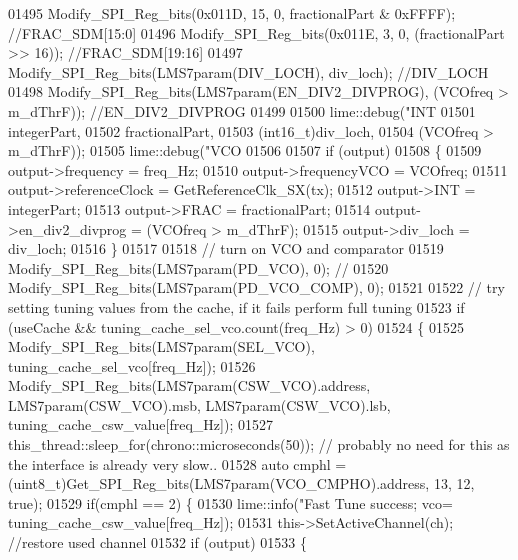 \begin{DoxyCode}
{{{{{{{{{{{{{{{{{{{{{{{{{{{{{{{{{{{{{{{{{{{01495     Modify_SPI_Reg_bits(0x011D, 15, 0, fractionalPart & 0xFFFF); \textcolor{comment}{//FRAC\_SDM[15:0]}
01496     Modify_SPI_Reg_bits(0x011E, 3, 0, (fractionalPart >> 16)); \textcolor{comment}{//FRAC\_SDM[19:16]}
01497     Modify_SPI_Reg_bits(LMS7param(DIV_LOCH), div\_loch); \textcolor{comment}{//DIV\_LOCH}
01498     Modify_SPI_Reg_bits(LMS7param(EN_DIV2_DIVPROG), (VCOfreq > m\_dThrF)); \textcolor{comment}{//EN\_DIV2\_DIVPROG}
01499 
01500     lime::debug(\textcolor{stringliteral}{"INT %
01501                 integerPart,
01502                 fractionalPart,
01503                 (int16\_t)div\_loch,
01504                 (VCOfreq > m\_dThrF));
01505     lime::debug(\textcolor{stringliteral}{"VCO %
01506 
01507     \textcolor{keywordflow}{if} (output)
01508     \{
01509         output->frequency = freq\_Hz;
01510         output->frequencyVCO = VCOfreq;
01511         output->referenceClock = GetReferenceClk_SX(tx);
01512         output->INT = integerPart;
01513         output->FRAC = fractionalPart;
01514         output->en_div2_divprog = (VCOfreq > m\_dThrF);
01515         output->div_loch = div\_loch;
01516     \}
01517 
01518     \textcolor{comment}{// turn on VCO and comparator}
01519     Modify_SPI_Reg_bits(LMS7param(PD_VCO), 0); \textcolor{comment}{//}
01520     Modify_SPI_Reg_bits(LMS7param(PD_VCO_COMP), 0);
01521 
01522     \textcolor{comment}{// try setting tuning values from the cache, if it fails perform full tuning}
01523     \textcolor{keywordflow}{if}  (useCache && tuning\_cache\_sel\_vco.count(freq\_Hz) > 0)
01524     \{
01525         Modify_SPI_Reg_bits(LMS7param(SEL_VCO), tuning\_cache\_sel\_vco[freq\_Hz]);
01526         Modify_SPI_Reg_bits(LMS7param(CSW_VCO).address, LMS7param(CSW_VCO).msb, 
      LMS7param(CSW_VCO).lsb, tuning\_cache\_csw\_value[freq\_Hz]);
01527         this\_thread::sleep\_for(chrono::microseconds(50)); \textcolor{comment}{// probably no need for this as the interface is
       already very slow..}
01528         \textcolor{keyword}{auto} cmphl = (uint8\_t)Get_SPI_Reg_bits(LMS7param(VCO_CMPHO).address, 13, 12, \textcolor{keyword}{true});
01529         \textcolor{keywordflow}{if}(cmphl == 2) \{
01530             lime::info(\textcolor{stringliteral}{"Fast Tune success; vco=%
      tuning\_cache\_csw\_value[freq\_Hz]);
01531             this->SetActiveChannel(ch); \textcolor{comment}{//restore used channel}
01532             \textcolor{keywordflow}{if} (output)
01533             \{
}}}}}}}}}}}}}}}}}}}}}}}}}}}}}}}}}}}}}}}}}}}}}}
\end{DoxyCode}

